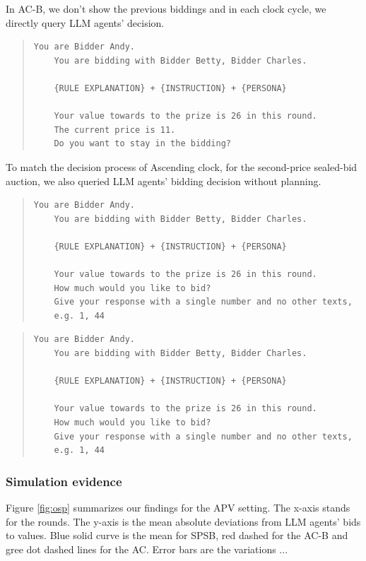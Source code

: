 \documentclass{article} %
\begin{document}
In AC-B, we don't show the previous biddings and in each clock cycle, we directly query LLM agents' decision.
\begin{quote}
\begin{lstlisting}[basicstyle=\ttfamily]
    You are Bidder Andy.            
    You are bidding with Bidder Betty, Bidder Charles.     
    
    {RULE EXPLANATION} + {INSTRUCTION} + {PERSONA} 

    Your value towards to the prize is 26 in this round.
    The current price is 11. 
    Do you want to stay in the bidding?
\end{lstlisting}
\end{quote}

To match the decision process of Ascending clock, for the second-price sealed-bid auction, we also queried LLM agents' bidding decision without planning.
\begin{quote}
\begin{lstlisting}[basicstyle=\ttfamily]
    You are Bidder Andy.            
    You are bidding with Bidder Betty, Bidder Charles.     
    
    {RULE EXPLANATION} + {INSTRUCTION} + {PERSONA} 

    Your value towards to the prize is 26 in this round.
    How much would you like to bid?
    Give your response with a single number and no other texts, 
    e.g. 1, 44
\end{lstlisting}
\end{quote}

\begin{quote}
\begin{lstlisting}[basicstyle=\ttfamily]
    You are Bidder Andy.            
    You are bidding with Bidder Betty, Bidder Charles.     
    
    {RULE EXPLANATION} + {INSTRUCTION} + {PERSONA} 

    Your value towards to the prize is 26 in this round.
    How much would you like to bid?
    Give your response with a single number and no other texts, 
    e.g. 1, 44
\end{lstlisting}
\end{quote}






\subsubsection{Simulation evidence}
Figure \ref{fig:osp} summarizes our findings for the APV setting. The x-axis stands for the rounds.
The y-axis is the mean absolute
deviations from LLM agents' bids to values. Blue solid curve is the mean for SPSB, red dashed for the AC-B and gree dot dashed lines for the AC.
Error bars are the variations ...
\end{document}
